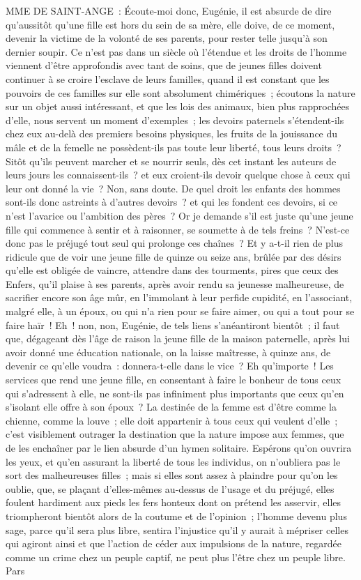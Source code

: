 \documentclass[french,twoside]{book} %
\begin{document}
MME DE SAINT-ANGE : Écoute-moi donc, Eugénie, il est absurde de dire qu’aussitôt qu’une fille est hors du sein de sa mère, elle doive, de ce moment, devenir la victime de la volonté de ses parents, pour rester telle jusqu’à son dernier soupir. Ce n’est pas dans un siècle où l’étendue et les droits de l’homme viennent d’être approfondis avec tant de soins, que de jeunes filles doivent continuer à se croire l’esclave de leurs familles, quand il est constant que les pouvoirs de ces familles sur elle sont absolument chimériques ; écoutons la nature sur un objet aussi intéressant, et que les lois des animaux, bien plus rapprochées d’elle, nous servent un moment d’exemples ; les devoirs paternels s’étendent-ils chez eux au-delà des premiers besoins physiques, les fruits de la jouissance du mâle et de la femelle ne possèdent-ils pas toute leur liberté, tous leurs droits ? Sitôt qu’ils peuvent marcher et se nourrir seuls, dès cet instant les auteurs de leurs jours les connaissent-ils ? et eux croient-ils devoir quelque chose à ceux qui leur ont donné la vie ? Non, sans doute. De quel droit les enfants des hommes sont-ils donc astreints à d’autres devoirs ? et qui les fondent ces devoirs, si ce n’est l’avarice ou l’ambition des pères ? Or je demande s’il est juste qu’une jeune fille qui commence à sentir et à raisonner, se soumette à de tels freins ? N’est-ce donc pas le préjugé tout seul qui prolonge ces chaînes ? Et y a-t-il rien de plus ridicule que de voir une jeune fille de quinze ou seize ans, brûlée par des désirs qu’elle est obligée de vaincre, attendre dans des tourments, pires que ceux des Enfers, qu’il plaise à ses parents, après avoir rendu sa jeunesse malheureuse, de sacrifier encore son âge mûr, en l’immolant à leur perfide cupidité, en l’associant, malgré elle, à un époux, ou qui n’a rien pour se faire aimer, ou qui a tout pour se faire haïr ! Eh ! non, non, Eugénie, de tels liens s’anéantiront bientôt ; il faut que, dégageant dès l’âge de raison la jeune fille de la maison paternelle, après lui avoir donné une éducation nationale, on la laisse maîtresse, à quinze ans, de devenir ce qu’elle voudra : donnera-t-elle dans le vice ? Eh qu’importe ! Les services que rend une jeune fille, en consentant à faire le bonheur de tous ceux qui s’adressent à elle, ne sont-ils pas infiniment plus importants que ceux qu’en s’isolant elle offre à son époux ? La destinée de la femme est d’être comme la chienne, comme la louve ; elle doit appartenir à tous ceux qui veulent d’elle ; c’est visiblement outrager la destination que la nature impose aux femmes, que de les enchaîner par le lien absurde d’un hymen solitaire. Espérons qu’on ouvrira les yeux, et qu’en assurant la liberté de tous les individus, on n’oubliera pas le sort des malheureuses filles ; mais si elles sont assez à plaindre pour qu’on les oublie, que, se plaçant d’elles-mêmes au-dessus de l’usage et du préjugé, elles foulent hardiment aux pieds les fers honteux dont on prétend les asservir, elles triompheront bientôt alors de la coutume et de l’opinion ; l’homme devenu plus sage, parce qu’il sera plus libre, sentira l’injustice qu’il y aurait à mépriser celles qui agiront ainsi et que l’action de céder aux impulsions de la nature, regardée comme un crime chez un peuple captif, ne peut plus l’être chez un peuple libre. Pars 
\end{document}
